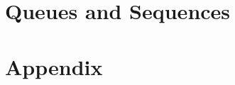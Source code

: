 \documentclass[a4paper,twoside]{book} %
\begin{document}



\part{Queues and Sequences}




\part{Appendix}
\appendix
\appendixpage
\noappendicestocpagenum
\addappheadtotoc





\printindex
\end{document}
